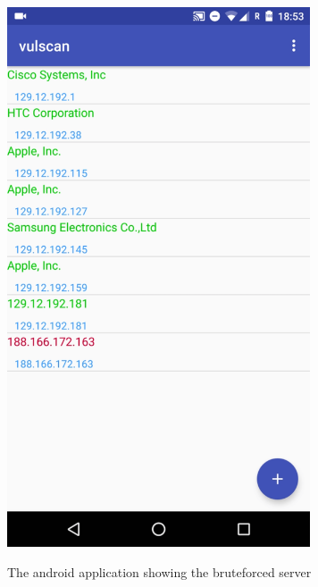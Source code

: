 \documentclass{report}
\begin{document}
\begin{figure}[h]
 \caption{The android application showing the bruteforced server}
 \centering
 \includegraphics[width=0.8\textwidth]{./img/exp/screen-test-and}
 \label{fig:test-and-serv}
\end{figure}
\end{document}
